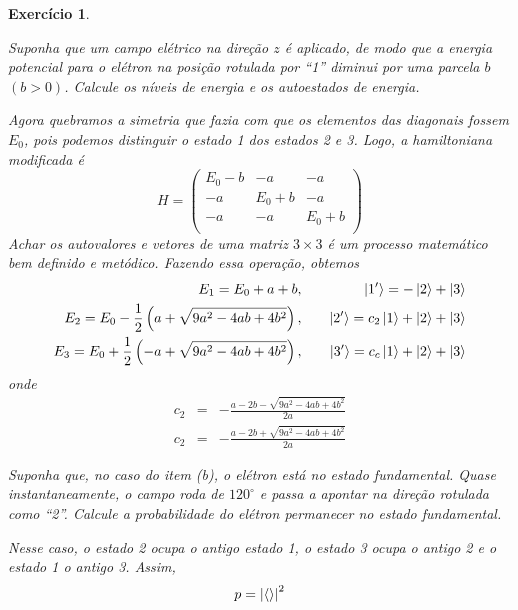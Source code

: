 \documentclass[12pt]{article}
\def\be{\begin{equation}}
\def\ee{\end{equation}}
\def\bea{\begin{eqnarray*}}
\def\eea{\end{eqnarray*}}
\def\f{\frac}
\def\l{\left}
\def\r{\right}
\newtheorem{exercise}{Exercício}
\begin{document}
\begin{exercise}
\begin{exercises}
			\item Suponha que um campo elétrico na direção $z$ é aplicado, de modo que a energia potencial para o elétron na posição rotulada por “1” diminui por uma parcela $b$
			$(b>0)$. Calcule os níveis de energia e os autoestados de energia.
			\begin{multianswer}
				Agora quebramos a simetria que fazia com que os elementos das diagonais fossem $E_0$, pois podemos distinguir o estado 1 dos estados 2 e 3. Logo, a hamiltoniana modificada é 
				\be
				H = 
				\begin{pmatrix}
					E_0 - b & -a & -a \\
					-a & E_0 + b & -a \\
					-a & -a & E_0 + b \\
				\end{pmatrix}
				\ee
				Achar os autovalores e vetores de uma matriz $3\times3$ é um processo matemático bem definido e metódico. Fazendo essa operação, obtemos
				\bea
					E_1 = E_0 + a + b, &\quad& \ket{1'} = -\ket{2} + \ket{3} \\
					E_2 = E_0 - \f{1}{2}\l( a + \sqrt{9a^2 - 4ab + 4b^2}\r), &\quad& \ket{2'} = c_2\ket{1} +\ket{2} + \ket{3} \\
					E_3 = E_0 + \f{1}{2}\l( -a + \sqrt{9a^2 - 4ab + 4b^2}\r), &\quad& \ket{3'} = c_c\ket{1} +\ket{2} + \ket{3}
				\eea
				onde
				\bea
					c_2 &=& - \f{a -2b - \sqrt{9a^2 -4ab + 4b^2}}{2a} \\					c_2 &=& - \f{a -2b + \sqrt{9a^2 -4ab + 4b^2}}{2a} 
				\eea
			\end{multianswer}
		
			\item Suponha que, no caso do item (b), o elétron está no estado fundamental.
			Quase instantaneamente, o campo roda de $120^\circ$ e passa a apontar na direção
			rotulada como “2”. Calcule a probabilidade do elétron permanecer no estado fundamental.
			\begin{multianswer}[true]
				Nesse caso, o estado 2 ocupa o antigo estado 1, o estado 3 ocupa o antigo 2 e o estado 1 o antigo 3. Assim,
				\be
					p = \l| \braket{} \r|^2
				\ee
			\end{multianswer}
			
		\end{exercises}
	\end{exercise}
	
\end{document}
